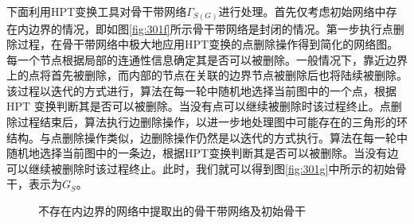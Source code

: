 下面利用HPT变换工具对骨干带网络$\Gamma_{S(G)}$进行处理。首先仅考虑初始网络中存在内边界的情况，即如图\ref{fig:301f}所示骨干带网络是封闭的情况。第一步执行点删除过程，在骨干带网络中极大地应用HPT变换的点删除操作得到简化的网络图。每一个节点根据局部的连通性信息确定其是否可以被删除。一般情况下，靠近边界上的点将首先被删除，而内部的节点在关联的边界节点被删除后也将陆续被删除。该过程以迭代的方式进行，算法在每一轮中随机地选择当前图中的一个点，根据HPT 变换判断其是否可以被删除。当没有点可以继续被删除时该过程终止。点删除过程结束后，算法执行边删除操作，以进一步地处理图中可能存在的三角形的环结构。与点删除操作类似，边删除操作仍然是以迭代的方式执行。算法在每一轮中随机地选择当前图中的一条边，根据HPT变换判断其是否可以被删除。当没有边可以继续被删除时该过程终止。此时，我们就可以得到图\ref{fig:301g}中所示的初始骨干，表示为$G_S$。
\begin{figure}[t]
  \centering
  \hspace{0.25em}%
  \hspace{0.25em}%
  \hspace{0.25em}%
  \hspace{0.25em}%
  \hspace{0.25em}%
\caption{不存在内边界的网络中提取出的骨干带网络及初始骨干}
\label{fig:305}
\end{figure}

